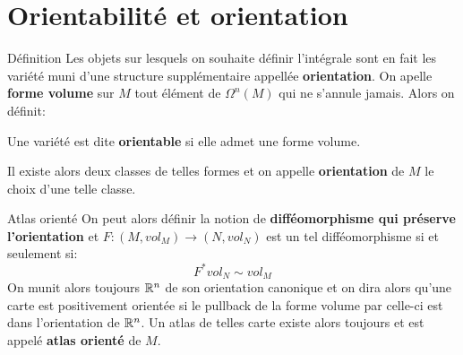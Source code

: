 \documentclass{beamer}
\begin{document}
    \section{Orientabilité et orientation}
        \begin{frame}{Définition}
            Les objets sur lesquels on souhaite définir l'intégrale sont en fait les variété muni d'une structure supplémentaire appellée \textbf{orientation}. On apelle \textbf{forme volume} sur $M$ tout élément de $\Omega^n(M)$ qui ne s'annule jamais. Alors on définit:
            \begin{center}
                Une variété est dite \textbf{orientable} si elle admet une forme volume.
            \end{center}
            Il existe alors deux classes de telles formes et on appelle \textbf{orientation} de $M$ le choix d'une telle classe.
        \end{frame}
        \begin{frame}{Atlas orienté}
            On peut alors définir la notion de \textbf{difféomorphisme qui préserve l'orientation} et $F : (M, vol_M) \longrightarrow (N, vol_N)$ est un tel difféomorphisme si et seulement si:
            \[
                F^*vol_N \sim vol_M
            \]
            On munit alors toujours $\mathbb{R}^n$ de son orientation canonique et on dira alors qu'une carte est positivement orientée si le pullback de la forme volume par celle-ci est dans l'orientation de $\mathbb{R}^n$. Un atlas de telles carte existe alors toujours et est appelé \textbf{atlas orienté} de $M$.
        \end{frame}
\end{document}
